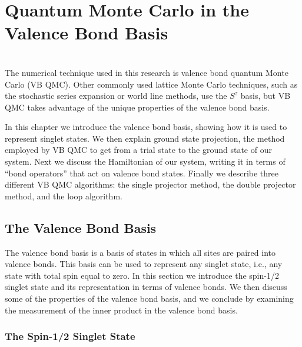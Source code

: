 
\chapter{Quantum Monte Carlo in the Valence Bond Basis}
\\
The numerical technique used in this research is valence bond quantum Monte Carlo (VB QMC).
Other commonly used lattice Monte Carlo techniques, such as the stochastic series expansion\cite{Sylji2002} or world line \cite{Evertz2003} methods, use the $S^z$ basis, but VB QMC takes advantage of the unique properties of the valence bond basis.  

In this chapter we introduce the valence bond basis, showing how it is used to represent singlet states.  
We then explain ground state projection, the method employed by VB QMC to get from a trial state to the ground state of our system.
Next we discuss the Hamiltonian of our system, writing it in terms of ``bond operators'' that act on valence bond states.
Finally we describe three different VB QMC algorithms: the single projector method, the double projector method, and the loop algorithm.

\section{The Valence Bond Basis} \label{sec:basis}
The valence bond basis is a basis of states in which all sites are paired into valence bonds.  
This basis can be used to represent any singlet state, i.e., any state with total spin equal to zero.
In this section we introduce the spin-1/2 singlet state and its representation in terms of valence bonds.
We then discuss some of the properties of the valence bond basis,
and we conclude by examining the measurement of the inner product in the valence bond basis.
\subsection{The Spin-1/2 Singlet State}

